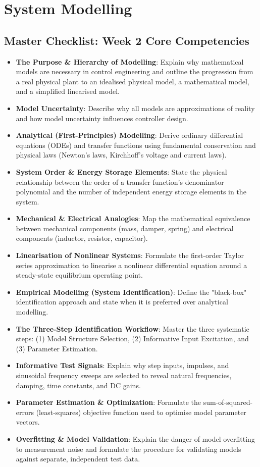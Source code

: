 \documentclass[12pt,onecolumn,twoside ]{article}
\begin{document}
	\newpage
	\section{System Modelling}

	
	\subsection{Master Checklist: Week 2 Core Competencies}
	\begin{itemize}
		\item[$\square$]
		\textbf{The Purpose \& Hierarchy of Modelling}: Explain why mathematical models are necessary in control engineering and outline the progression from a real physical plant to an idealised physical model, a mathematical model, and a simplified linearised model.
		\item[$\square$]
		\textbf{Model Uncertainty}: Describe why all models are approximations of reality and how model uncertainty influences controller design.
		\item[$\square$]
		\textbf{Analytical (First-Principles) Modelling}: Derive ordinary differential equations (ODEs) and transfer functions using fundamental conservation and physical laws (Newton’s laws, Kirchhoff’s voltage and current laws).
		\item[$\square$]
		\textbf{System Order \& Energy Storage Elements}: State the physical relationship between the order of a transfer function's denominator polynomial and the number of independent energy storage elements in the system.
		\item[$\square$]
		\textbf{Mechanical \& Electrical Analogies}: Map the mathematical equivalence between mechanical components (mass, damper, spring) and electrical components (inductor, resistor, capacitor).
		\item[$\square$]
		\textbf{Linearisation of Nonlinear Systems}: Formulate the first-order Taylor series approximation to linearise a nonlinear differential equation around a steady-state equilibrium operating point.
		\item[$\square$]
		\textbf{Empirical Modelling (System Identification)}: Define the "black-box" identification approach and state when it is preferred over analytical modelling.
		\item[$\square$]
		\textbf{The Three-Step Identification Workflow}: Master the three systematic steps: (1) Model Structure Selection, (2) Informative Input Excitation, and (3) Parameter Estimation.
		\item[$\square$]
		\textbf{Informative Test Signals}: Explain why step inputs, impulses, and sinusoidal frequency sweeps are selected to reveal natural frequencies, damping, time constants, and DC gains.
		\item[$\square$]
		\textbf{Parameter Estimation \& Optimization}: Formulate the sum-of-squared-errors (least-squares) objective function used to optimise model parameter vectors.
		\item[$\square$]
		\textbf{Overfitting \& Model Validation}: Explain the danger of model overfitting to measurement noise and formulate the procedure for validating models against separate, independent test data.
	\end{itemize}
	
\end{document}
